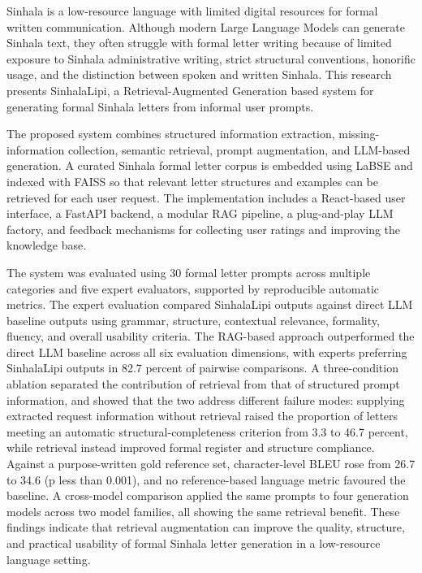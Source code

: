 \documentclass[12pt]{uomthesis}
\begin{document}
\begin{abstractpage}
Sinhala is a low-resource language with limited digital resources for formal written communication. Although modern Large Language Models can generate Sinhala text, they often struggle with formal letter writing because of limited exposure to Sinhala administrative writing, strict structural conventions, honorific usage, and the distinction between spoken and written Sinhala. This research presents SinhalaLipi, a Retrieval-Augmented Generation based system for generating formal Sinhala letters from informal user prompts.

The proposed system combines structured information extraction, missing-information collection, semantic retrieval, prompt augmentation, and LLM-based generation. A curated Sinhala formal letter corpus is embedded using LaBSE and indexed with FAISS so that relevant letter structures and examples can be retrieved for each user request. The implementation includes a React-based user interface, a FastAPI backend, a modular RAG pipeline, a plug-and-play LLM factory, and feedback mechanisms for collecting user ratings and improving the knowledge base.

The system was evaluated using 30 formal letter prompts across multiple categories and five expert evaluators, supported by reproducible automatic metrics. The expert evaluation compared SinhalaLipi outputs against direct LLM baseline outputs using grammar, structure, contextual relevance, formality, fluency, and overall usability criteria. The RAG-based approach outperformed the direct LLM baseline across all six evaluation dimensions, with experts preferring SinhalaLipi outputs in 82.7 percent of pairwise comparisons. A three-condition ablation separated the contribution of retrieval from that of structured prompt information, and showed that the two address different failure modes: supplying extracted request information without retrieval raised the proportion of letters meeting an automatic structural-completeness criterion from 3.3 to 46.7 percent, while retrieval instead improved formal register and structure compliance. Against a purpose-written gold reference set, character-level BLEU rose from 26.7 to 34.6 (p less than 0.001), and no reference-based language metric favoured the baseline. A cross-model comparison applied the same prompts to four generation models across two model families, all showing the same retrieval benefit. These findings indicate that retrieval augmentation can improve the quality, structure, and practical usability of formal Sinhala letter generation in a low-resource language setting.
\end{abstractpage}
\end{document}
